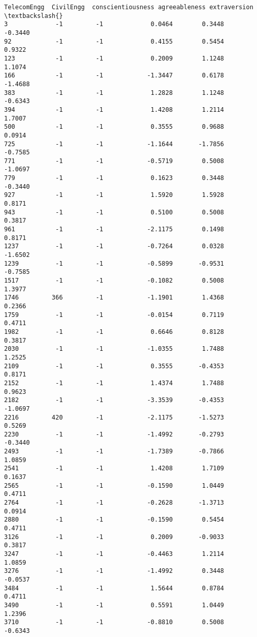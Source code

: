 \documentclass[11pt]{article}
\begin{document}
\begin{tcolorbox}[breakable, size=fbox, boxrule=.5pt, pad at break*=1mm, opacityfill=0]
\begin{Verbatim}[commandchars=\\\{\}]
     TelecomEngg  CivilEngg  conscientiousness agreeableness extraversion  \textbackslash{}
3             -1         -1             0.0464        0.3448      -0.3440
92            -1         -1             0.4155        0.5454       0.9322
123           -1         -1             0.2009        1.1248       1.1074
166           -1         -1            -1.3447        0.6178      -1.4688
383           -1         -1             1.2828        1.1248      -0.6343
394           -1         -1             1.4208        1.2114       1.7007
500           -1         -1             0.3555        0.9688       0.0914
725           -1         -1            -1.1644       -1.7856      -0.7585
771           -1         -1            -0.5719        0.5008      -1.0697
779           -1         -1             0.1623        0.3448      -0.3440
927           -1         -1             1.5920        1.5928       0.8171
943           -1         -1             0.5100        0.5008       0.3817
961           -1         -1            -2.1175        0.1498       0.8171
1237          -1         -1            -0.7264        0.0328      -1.6502
1239          -1         -1            -0.5899       -0.9531      -0.7585
1517          -1         -1            -0.1082        0.5008       1.3977
1746         366         -1            -1.1901        1.4368       0.2366
1759          -1         -1            -0.0154        0.7119       0.4711
1982          -1         -1             0.6646        0.8128       0.3817
2030          -1         -1            -1.0355        1.7488       1.2525
2109          -1         -1             0.3555       -0.4353       0.8171
2152          -1         -1             1.4374        1.7488       0.9623
2182          -1         -1            -3.3539       -0.4353      -1.0697
2216         420         -1            -2.1175       -1.5273       0.5269
2230          -1         -1            -1.4992       -0.2793      -0.3440
2493          -1         -1            -1.7389       -0.7866       1.0859
2541          -1         -1             1.4208        1.7109       0.1637
2565          -1         -1            -0.1590        1.0449       0.4711
2764          -1         -1            -0.2628       -1.3713       0.0914
2880          -1         -1            -0.1590        0.5454       0.4711
3126          -1         -1             0.2009       -0.9033       0.3817
3247          -1         -1            -0.4463        1.2114       1.0859
3276          -1         -1            -1.4992        0.3448      -0.0537
3484          -1         -1             1.5644        0.8784       0.4711
3490          -1         -1             0.5591        1.0449       1.2396
3710          -1         -1            -0.8810        0.5008      -0.6343


\end{Verbatim}
\end{tcolorbox}
\end{document}

